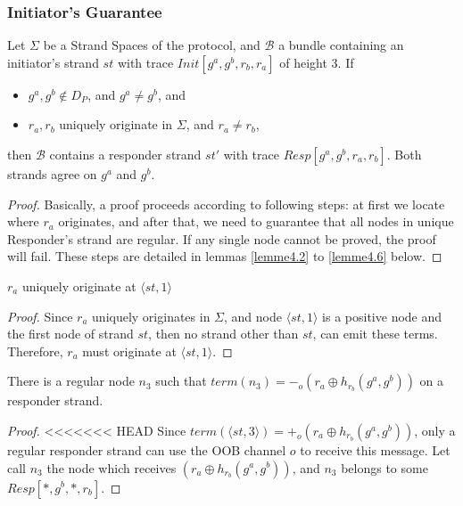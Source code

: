 \begin{itemize}
\subsubsection{Initiator's Guarantee}

\begin{Proposition}
Let $\Sigma$ be a Strand Spaces of the protocol, and $\mathcal{B}$ a bundle containing an initiator's strand $st$ with trace $Init[g^a,g^b,r_b,r_a]$ of height 3. If
 \begin{itemize}
 \item $g^a,g^b \not\in D_P$, and $g^a \not= g^b$, and
 \item $r_a,r_b$ uniquely originate in $\Sigma$, and $r_a \not= r_b$,
 \end{itemize}
then $\mathcal{B}$ contains a responder strand $st'$ with trace $Resp[g^a,g^b,r_a,r_b]$. Both strands agree on $g^a$ and $g^b$.
\end{Proposition}

\begin{proof}
Basically, a proof proceeds according to following steps: at first we locate where $r_a$ originates, and after that, we need to guarantee that all nodes in unique Responder's strand are regular.
 If any single node cannot be proved, the proof will fail. 
These steps are detailed in lemmas \ref{lemme4.2} to \ref{lemme4.6} below.
\end{proof}

\begin{Lemma}\label{lemme4.2}
$r_a$ uniquely originate at $\langle st,1 \rangle$ 
\end{Lemma}

\begin{proof}
Since $r_a$ uniquely originates in $\Sigma$, and node $\langle st,1 \rangle$ is a positive node and the first node of strand $st$, then no strand other than $st$, can emit these terms. Therefore, $r_a$ must originate at $\langle st,1 \rangle$.
\end{proof}

\begin{Lemma}\label{lemme4.3}
There is a regular node $n_3$ such that $term(n_3)= -_o(r_a \oplus h_{r_b}(g^a,g^b))$ on a responder strand. 
\end{Lemma}

\begin{proof}
<<<<<<< HEAD
Since $term(\langle st,3 \rangle) = +_o(r_a \oplus h_{r_b}(g^a,g^b))$, only a regular responder strand can use the OOB channel $o$ to receive this message. Let call $n_3$ the node which receives $(r_a \oplus h_{r_b}(g^a,g^b))$, and $n_3$ belongs to some $Resp[*,g^b,*,r_b]$.
\end{proof}


\end{itemize}
